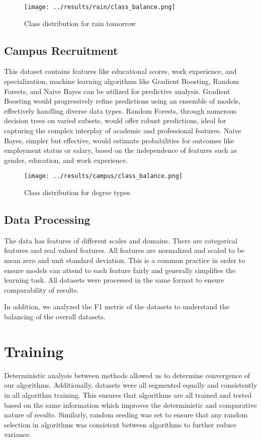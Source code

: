 \documentclass[10pt,twocolumn,letterpaper]{article}
\begin{document}
\begin{figure}[h]
  \texttt{[image: ../results/rain/class\_balance.png]}
  \caption{Class distribution for rain tomorrow}
\end{figure}

\subsection{Campus Recruitment \cite{ds4}}

This dataset contains features like educational scores, work experience, and specialization, machine learning algorithms like Gradient Boosting, Random Forests, and Naive Bayes can be utilized for predictive analysis.
Gradient Boosting would progressively refine predictions using an ensemble of models, effectively handling diverse data types.
Random Forests, through numerous decision trees on varied subsets, would offer robust predictions, ideal for capturing the complex interplay of academic and professional features.
Naive Bayes, simpler but effective, would estimate probabilities for outcomes like employment status or salary, based on the independence of features such as gender, education, and work experience.

\begin{figure}[h]
  \texttt{[image: ../results/campus/class\_balance.png]}
  \caption{Class distribution for degree types}
\end{figure}

\subsection{Data Processing}

The data has features of different scales and domains.
There are categorical features and real valued features.
All features are normalized and scaled to be mean zero and unit standard deviation.
This is a common practice in order to ensure models can attend to each feature fairly and generally simplifies the learning task.
All datasets were processed in the same format to ensure comparability of results.

In addition, we analyzed the F1 metric of the datasets to understand the balancing of the overall datasets.


\section{Training}

Deterministic analysis between methods allowed us to determine convergence of our algorithms.
Additionally, datasets were all segmented equally and consistently in all algorithm training.
This ensures that algorithms are all trained and tested based on the same information which improves the deterministic and comparative nature of results.
Similarly, random seeding was set to ensure that any random selection in algorithms was consistent between algorithms to further reduce variance.
\end{document}
